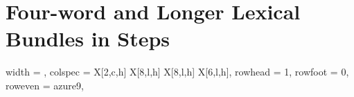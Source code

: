 \documentclass[a4paper]{ctexbook}
\begin{document}
{\begin{longtblr}
\bottomrule

\end{longtblr}
}

\chapter{Four-word and Longer Lexical Bundles in Steps}

\begin{landscape}
  {\tiny
  \begin{longtblr}[
      caption = {Four-word and Longer Lexical Bundles in Steps},
      label = {tab:Four-word and Longer Lexical Bundles in Steps},
  ]{
      width = \linewidth,
      colspec = {X[2,c,h]  X[8,l,h]  X[8,l,h]  X[6,l,h]},
      rowhead = 1, rowfoot = 0, %
      row{even} = {azure9},
  }
      

\end{longtblr}}
\end{landscape}
\end{document}
